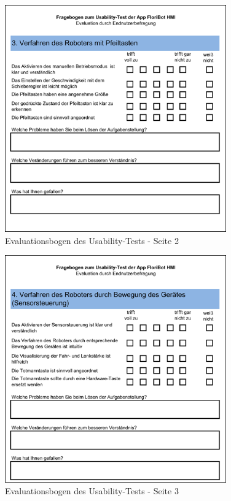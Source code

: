 \newpage
\begin{figure}[H]
	\centering
		\includegraphics[width=0.85\textwidth]{03_Grafiken/Anhang/UsabilityBogen/UsabilityEvaluationsbogen1.png}
	\caption[Evaluationsbogen des Usability-Tests - Seite 2]{Evaluationsbogen des Usability-Tests - Seite 2}
	\label{fig:UsabilityEvaluationsbogen}
\end{figure}
\newpage
\begin{figure}[H]
	\centering
		\includegraphics[width=0.85\textwidth]{03_Grafiken/Anhang/UsabilityBogen/UsabilityEvaluationsbogen2.png}
	\caption[Evaluationsbogen des Usability-Tests - Seite 3]{Evaluationsbogen des Usability-Tests - Seite 3}
	\label{fig:UsabilityEvaluationsbogen}
\end{figure}
